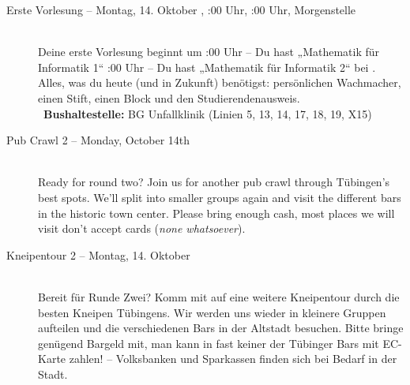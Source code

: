\begin{description}

\ifbachelor
\item[Erste Vorlesung -- Montag, 14. Oktober \YEAR, \ifwintersemester 8:00 Uhr, \else 10:00 Uhr, \fi Morgenstelle]~\\
Deine erste Vorlesung beginnt um
:00 Uhr -- Du hast „Mathematik für Informatik 1“  \fi
{}:00 Uhr -- Du hast „Mathematik für Informatik 2“  \fi
bei \Matheprof.
Alles, was du heute (und in Zukunft) benötigst: persönlichen Wachmacher, einen Stift, einen Block und den Studierendenausweis.\\
~\textbf{Bushaltestelle:} BG Unfallklinik (Linien 5, 13, 14, 17, 18, 19, X15)
\fi

\ifml
\item[Pub Crawl 2 -- Monday, October 14th \YEAR]~\\
    Ready for round two? Join us for another pub crawl through Tübingen's best spots.
    We'll split into smaller groups again and visit the different bars in the historic town center.
    Please bring enough cash, most places we will visit don't accept cards (\emph{none whatsoever}).
\else
\item[Kneipentour 2 -- Montag, 14. Oktober \YEAR]~\\
    Bereit für Runde Zwei? Komm mit auf eine weitere Kneipentour durch die besten Kneipen Tübingens.
    Wir werden uns wieder in kleinere Gruppen aufteilen und die verschiedenen Bars in der Altstadt besuchen.
    Bitte bringe genügend Bargeld mit, man kann in fast keiner der Tübinger Bars mit EC-Karte zahlen! -- Volksbanken und Sparkassen finden sich bei Bedarf in der Stadt.
\fi


\end{description}
